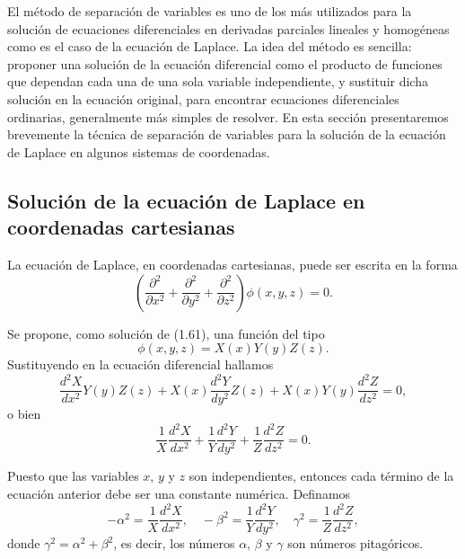 \documentclass[12pt,a4paper]{book}
\begin{document}
El método de separación de variables es uno de los más utilizados para la solución de ecuaciones diferenciales en derivadas parciales lineales y homogéneas como es el caso de la ecuación de Laplace. La idea del método es sencilla: proponer una solución de la ecuación diferencial como el producto de funciones que dependan cada una de una sola variable independiente, y sustituir dicha solución en la ecuación original, para encontrar ecuaciones diferenciales ordinarias, generalmente más simples de resolver. En esta sección presentaremos brevemente la técnica de separación de variables para la solución de la ecuación de Laplace en algunos sistemas de coordenadas.

\subsection{Solución de la ecuación de Laplace en coordenadas cartesianas}

La ecuación de Laplace, en coordenadas cartesianas, puede ser escrita en la forma
\begin{equation}
\left(\frac{\partial^2}{\partial x^2} + \frac{\partial^2}{\partial y^2} + \frac{\partial^2}{\partial z^2}\right) \phi(x, y, z) = 0.
\end{equation}

Se propone, como solución de (1.61), una función del tipo
\begin{equation}
\phi(x, y, z) = X(x)Y(y)Z(z).
\end{equation}
Sustituyendo en la ecuación diferencial hallamos
\begin{equation}
\frac{d^2X}{dx^2}Y(y)Z(z) + X(x)\frac{d^2Y}{dy^2}Z(z) + X(x)Y(y)\frac{d^2Z}{dz^2} = 0,
\end{equation}
o bien
\begin{equation}
\frac{1}{X}\frac{d^2X}{dx^2} + \frac{1}{Y}\frac{d^2Y}{dy^2} + \frac{1}{Z}\frac{d^2Z}{dz^2} = 0.
\end{equation}

Puesto que las variables $x$, $y$ y $z$ son independientes, entonces cada término de la ecuación anterior debe ser una constante numérica. Definamos
\begin{equation}
-\alpha^2 = \frac{1}{X}\frac{d^2X}{dx^2}, \quad -\beta^2 = \frac{1}{Y}\frac{d^2Y}{dy^2}, \quad \gamma^2 = \frac{1}{Z}\frac{d^2Z}{dz^2},
\end{equation}
donde $\gamma^2 = \alpha^2 + \beta^2$, es decir, los números $\alpha$, $\beta$ y $\gamma$ son números pitagóricos.
\end{document}
